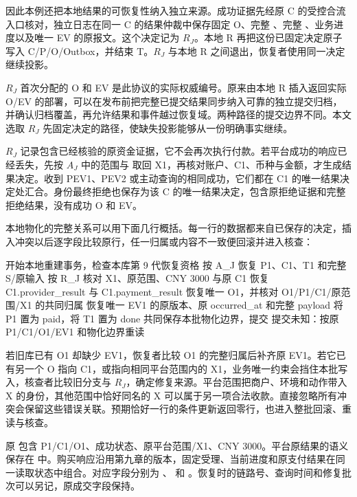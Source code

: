 因此本例还把本地结果的可恢复性纳入独立来源。成功证据先经原 C 的受控合流入口核对，独立日志在同一 C 的结果仲裁中保存固定 O、完整 、完整 、业务进度以及唯一 EV 的原报文。这个决定记为 $R_J$。本地 R 再把这份已固定决定原子写入 C/P/O/Outbox，并结束 T。$R_J$ 与本地 R 之间退出，恢复者使用同一决定继续投影。

$R_J$ 首次分配的 O 和 EV 是此协议的实际权威编号。原来由本地 R 插入返回实际 O/EV 的部署，可以在发布前把完整已提交结果同步纳入可靠的独立提交归档，并确认归档覆盖，再允许结果和事件越过恢复域。两种路径的提交边界不同。本文选取 $R_J$ 先固定决定的路径，使缺失投影能够从一份明确事实继续。

$R_J$ 记录包含已经核验的原资金证据，它不会再次执行付款。若平台成功的响应已经丢失，先按 $A_J$ 中的范围与  取回 X1，再核对账户、C1、币种与金额，才生成结果决定。收到 PEV1、PEV2 或主动查询的相同成功，它们都在 C1 的唯一结果决定处汇合。身份最终拒绝也保存为该 C 的唯一结果决定，包含原拒绝证据和完整拒绝结果，没有成功 O 和 EV。


本地物化的完整关系可以用下面几行概括。每一行的数据都来自已保存的决定，插入冲突以后逐字段比较原行，任一归属或内容不一致便回滚并进入核查：

\begin{BookCode}
开始本地重建事务，检查本库第 9 代恢复资格
按 A_J 恢复 P1、C1、T1 和完整 S/原输入
按 R_J 核对 X1、原范围、CNY 3000 与原 C1
恢复 C1.provider_result 与 C1.payment_result
恢复唯一 O1，并核对 O1/P1/C1/原范围/X1 的共同归属
恢复唯一 EV1 的原版本、原 occurred_at 和完整 payload
将 P1 置为 paid，将 T1 置为 done
共同保存本批物化边界，提交
提交未知：按原 P1/C1/O1/EV1 和物化边界重读
\end{BookCode}

若旧库已有 O1 却缺少 EV1，恢复者比较 O1 的完整归属后补齐原 EV1。若它已有另一个 O 指向 C1，或指向相同平台范围内的 X1，业务唯一约束会挡住本批写入，核查者比较旧分支与 $R_J$，确定修复来源。平台范围把商户、环境和动作带入 X 的身份，其他范围中恰好同名的 X 可以属于另一项合法收款。直接忽略所有冲突会保留这些错误关联。预期恰好一行的条件更新返回零行，也进入整批回滚、重读与核查。


原  包含 P1/C1/O1、成功状态、原平台范围/X1、CNY 3000。平台原结果的语义保存在  中。购买响应沿用第九章的版本，固定受理、当前进度和原支付结果在同一读取状态中组合。对应字段分别为 、 和 。恢复时的链路号、查询时间和修复批次可以另记，原成交字段保持。

